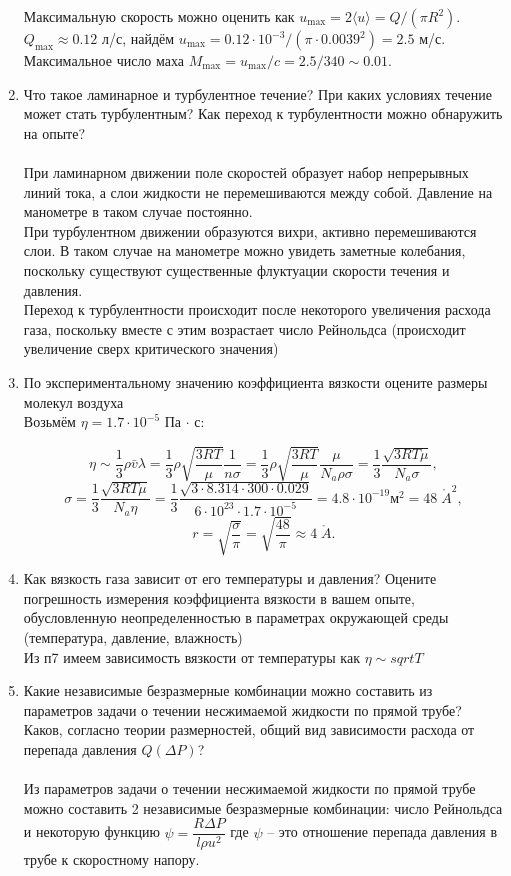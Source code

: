 \documentclass[a4paper,12pt]{article}
\begin{document}
\begin{enumerate}
Максимальную скорость можно оценить как $u_\text{max} = 2 \langle u \rangle = Q / (\pi R^2)$. $Q_\text{max} \approx 0.12 $ л/с, найдём $u_\text{max} = 0.12 \cdot 10 ^ {-3} / (\pi \cdot 0.0039 ^ 2) = 2.5$ м/с. Максимальное число маха $M_\text{max} = u_\text{max} / c = 2.5 / 340 \sim 0.01 $.
\item
Что такое ламинарное и турбулентное течение? При каких условиях течение может стать турбулентным? Как переход к турбулентности можно обнаружить на опыте?\\\\
При ламинарном движении поле скоростей образует набор непрерывных линий тока, а слои жидкости не перемешиваются между собой. Давление на манометре в таком случае постоянно.\\
При турбулентном движении образуются вихри, активно перемешиваются слои. В таком случае на манометре можно увидеть заметные колебания, поскольку существуют существенные флуктуации скорости течения и давления.\\
Переход к турбулентности происходит после некоторого увеличения расхода газа, поскольку вместе с этим возрастает число Рейнольдса (происходит увеличение сверх критического значения)
\item 
По экспериментальному значению коэффициента вязкости оцените размеры молекул воздуха\\
Возьмём $\eta = 1.7 \cdot 10^{-5}$ Па $\cdot$ с:

\[
\eta \sim \frac{1}{3}\rho \bar{v} \lambda = \frac{1}{3} \rho \sqrt{\frac{3 R T}{\mu}} \frac{1}{n \sigma} = \frac{1}{3} \rho \sqrt{\frac{3 R T}{\mu}} \frac{\mu}{N_a \rho \sigma} = \frac{1}{3} \frac{\sqrt{3 R T \mu}}{N_a \sigma} ,
\]\[
\sigma = \frac{1}{3} \frac{\sqrt{3 R T \mu}}{N_a \eta} = \frac{1}{3} \frac{\sqrt{3 \cdot 8.314 \cdot 300 \cdot 0.029}}{6 \cdot 10^{23} \cdot 1.7 \cdot 10^{-5}} = 4.8 \cdot 10^{-19} \text{м}^2 = 48 \; \mathring{A}^2,
\]\[
r = \sqrt{\frac{\sigma}{\pi}} = \sqrt{\frac{48}{\pi}} \approx 4 \; \mathring{A}.
\]

\item 
Как вязкость газа зависит от его температуры и давления? Оцените погрешность
измерения коэффициента вязкости в вашем опыте, обусловленную неопределенностью в параметрах окружающей среды (температура, давление, влажность)\\
Из п7 имеем зависимость вязкости от температуры как $\eta \sim sqrt{T}$
\item
Какие независимые безразмерные комбинации можно составить из параметров задачи о течении несжимаемой жидкости по прямой трубе? Каков, согласно теории
размерностей, общий вид зависимости расхода от перепада давления $Q(\Delta P)$?\\\\
Из параметров задачи о течении несжимаемой жидкости по прямой трубе можно составить 2 независимые безразмерные комбинации: число Рейнольдса и некоторую функцию $\psi = \dfrac{R\Delta P}{l \rho u^2}$ где  $\psi$ -- это отношение перепада давления в трубе к скоростному напору.
    

\end{enumerate}
\end{document}

